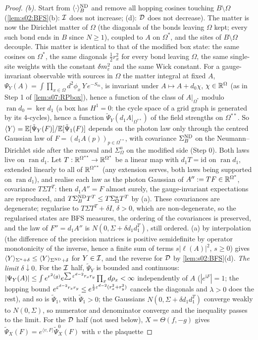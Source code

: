 \begin{proof}
\emph{(b).} Start from $\langle\cdot\rangle^{\mathrm{ND}}_B$ and remove all hopping cosines touching $B\setminus\Omega$ (\cref{lem:s02:BFS}(b): $\mathcal I$ does not increase; (d): $\mathcal D$ does not decrease). The matter is now the Dirichlet matter of $\Omega$ (the diagonals of the bonds leaving $\Omega$ kept; every such bond ends in $B$ since $N\ge1$), coupled to $A$ on $\Omega^*$, and the sites of $B\setminus\Omega$ decouple. This matter is identical to that of the modified box state: the same cosines on $\Omega^*$, the same diagonals $\frac12r_x^2$ for every bond leaving $\Omega$, the same single-site weights with the constant $\delta m^2_{\varepsilon}$ and the same Wick constant. For a gauge-invariant observable with sources in $\Omega$ the matter integral at fixed $A$, $\Psi_Y(A)=\int\prod_{x\in\Omega}d^2\phi_x\,Y\,e^{-S_m}$, is invariant under $A\mapsto A+d_0\chi$, $\chi\in\mathbb R^\Omega$ (as in Step 1 of \cref{lem:s07:RPbox}), hence a function of the class of $A|_{\Omega^*}$ modulo $\operatorname{ran}d_0=\ker d_1$ (a box has $H^1=0$: the cycle space of a grid graph is generated by its $4$-cycles), hence a function $\tilde\Psi_Y(d_1A|_{\Omega^{**}})$ of the field strengths on $\Omega^{**}$. So $\langle Y\rangle=\mathbb E[\tilde\Psi_Y(F)]/\mathbb E[\tilde\Psi_1(F)]$ depends on the photon law only through the centred Gaussian law of $F=(d_1A(p))_{p\in\Omega^{**}}$, with covariance $\Sigma^{\mathrm{ND}}_B$ on the Neumann--Dirichlet side after the removal and $\Sigma^u_\Omega$ on the modified side (Step 0). Both laws live on $\operatorname{ran}d_1$. Let $T:\mathbb R^{\Omega^{**}}\to\mathbb R^{\Omega^*}$ be a linear map with $d_1T=\mathrm{id}$ on $\operatorname{ran}d_1$, extended linearly to all of $\mathbb R^{\Omega^{**}}$ (any extension serves, both laws being supported on $\operatorname{ran}d_1$), and realise each law as the photon Gaussian of $A'':= TF\in\mathbb R^{\Omega^*}$, covariance $T\Sigma T^T$: then $d_1A''=F$ almost surely, the gauge-invariant expectations are reproduced, and $T\Sigma^{\mathrm{ND}}_BT^T\le T\Sigma^u_\Omega T^T$ by (a). These covariances are degenerate; regularise to $T\Sigma T^T+\delta I$, $\delta>0$, which are non-degenerate, so the regularised states are BFS measures, the ordering of the covariances is preserved, and the law of $F''=d_1A''$ is $N(0,\Sigma+\delta d_1d_1^T)$, still ordered. (a) by interpolation (the difference of the precision matrices is positive semidefinite by operator monotonicity of the inverse, hence a finite sum of terms $s|\ell(A)|^2$, $s\ge0$) gives $\langle Y\rangle_{\Sigma^u+\delta}\le\langle Y\rangle_{\Sigma^{\mathrm{ND}}+\delta}$ for $Y\in\mathcal I$, and the reverse for $\mathcal D$ by \cref{lem:s02:BFS}(d). \emph{The limit $\delta\downarrow0$.} For the $\mathcal I$ half, $\tilde\Psi_Y$ is bounded and continuous: $|\Psi_Y(A)|\le\int e^{r^2(g)}e^{\sum\varepsilon^{d-2}r_xr_y}\prod_xd\rho_x<\infty$ independently of $A$ ($|e^{\mathrm iF}|=1$; the hopping bound $e^{\varepsilon^{d-2}r_xr_y}\le e^{\frac12\varepsilon^{d-2}(r_x^2+r_y^2)}$ cancels the diagonals and $\lambda>0$ does the rest), and so is $\tilde\Psi_1$, with $\tilde\Psi_1>0$; the Gaussians $N(0,\Sigma+\delta d_1d_1^T)$ converge weakly to $N(0,\Sigma)$, so numerator and denominator converge and the inequality passes to the limit. For the $\mathcal D$ half (not used below), $X=\Theta(f,-g)$ gives $\tilde\Psi_X(F)=e^{\langle v,F\rangle}\tilde\Psi^0_X(F)$ with $v$ the plaquette 
\end{proof}
